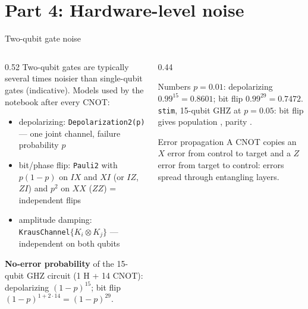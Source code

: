 \documentclass[aspectratio=169,11pt]{beamer}
\newcommand{\key}[1]{{\color{qdark}\textbf{#1}}}
\begin{document}
\section{Part 4: Hardware-level noise}
\begin{frame}[label=fTwoQ]{Two-qubit gate noise}
  \begin{columns}[T]
    \begin{column}{0.52\textwidth}
      \small
      Two-qubit gates are typically several times noisier than single-qubit gates (indicative). Models used by the notebook after every CNOT:
      \begin{itemize}\itemsep1pt\scriptsize
        \item depolarizing: \texttt{Depolarization2(p)} --- one joint channel, failure probability $p$
        \item bit/phase flip: \texttt{Pauli2} with $p(1-p)$ on $IX$ and $XI$ (or $IZ$, $ZI$) and $p^2$ on $XX$ ($ZZ$) = independent flips
        \item amplitude damping: \texttt{KrausChannel}$\{K_i\otimes K_j\}$ --- independent on both qubits
      \end{itemize}
      \key{No-error probability} of the 15-qubit GHZ circuit (1 H + 14 CNOT):
      depolarizing $(1-p)^{15}$; bit flip $(1-p)^{1 + 2\cdot14} = (1-p)^{29}$.
    \end{column}
    \begin{column}{0.44\textwidth}
      \begin{exampleblock}{Numbers}
        \scriptsize $p = 0.01$: depolarizing $0.99^{15} = 0.8601$; bit flip $0.99^{29} = 0.7472$.\\
        \texttt{stim}, 15-qubit GHZ at $p = 0.05$: bit flip gives population \numbfpop, parity \numbfpar.
      \end{exampleblock}
      \begin{alertblock}{Error propagation}
        \scriptsize A CNOT copies an $X$ error from control to target and a $Z$ error from target to control: errors spread through entangling layers.
      \end{alertblock}
    \end{column}
  \end{columns}
\end{frame}
\end{document}
